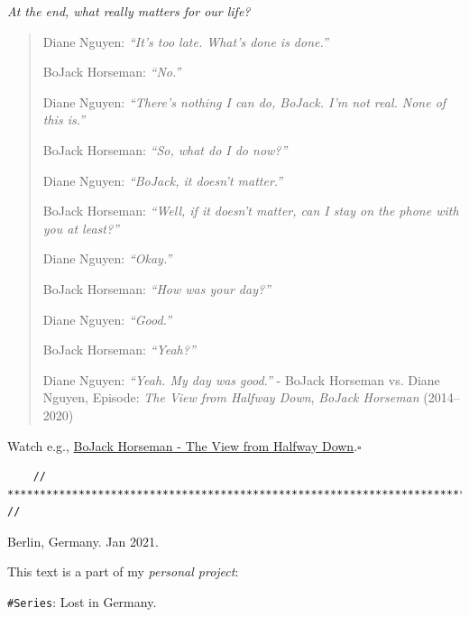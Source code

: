 \documentclass[12pt]{article}
\begin{document}
{\it At the end, what really matters for our life?}
\begin{quotation}
	Diane Nguyen: {\it ``It's too late. What's done is done.''}
	
	BoJack Horseman: {\it ``No.''}
	
	Diane Nguyen: {\it ``There's nothing I can do, BoJack. I'm not real. None of this is.''}
	
	BoJack Horseman: {\it ``So, what do I do now?''}
	
	Diane Nguyen: {\it ``BoJack, it doesn't matter.''}
	
	BoJack Horseman: {\it ``Well, if it doesn't matter, can I stay on the phone with you at least?''}
	
	Diane Nguyen: {\it ``Okay.''}
	
	BoJack Horseman: {\it ``How was your day?''}
	
	Diane Nguyen: {\it ``Good.''}
	
	BoJack Horseman: {\it ``Yeah?''}
	
	Diane Nguyen: {\it ``Yeah. My day was good.''} - BoJack Horseman vs. Diane Nguyen,  Episode: {\it The View from Halfway Down}, {\it BoJack Horseman} (2014--2020)
\end{quotation}
Watch e.g., \href{https://www.youtube.com/watch?v=Pt21dU5Pu8g}{BoJack Horseman - The View from Halfway Down}.\hfill$\square$

\begin{verbatim}
	// ************************************************************************* //
\end{verbatim}

\begin{flushright}
	{\sc Berlin, Germany}. Jan 2021.
	
	This text is a part of my {\it personal project}: 
	
	\texttt{\#Series}: {\sc Lost in Germany}.
\end{flushright}
\end{document}
